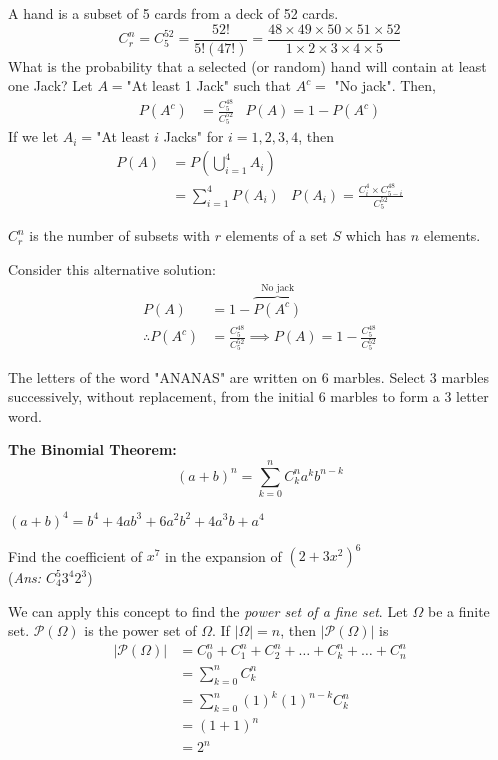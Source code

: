 \documentclass{article}
\begin{document}
	\begin{exmp}
		A hand is a subset of 5 cards from a deck of 52 cards.
		$$ C_r^n = C_5^{52} = \frac{52!}{5! (47!)} = \frac{48 \times 49 \times 50 \times 51 \times 52}{1 \times 2 \times 3 \times 4 \times 5}$$
		What is the probability that a selected (or random) hand will contain at least one Jack?
		Let $A = $"At least 1 Jack" such that  $A^c =$ "No jack". Then,
		\begin{align*}
			P(A^c) &= \frac{C^{48}_5}{C^{52}_5} &P(A) = 1-P(A^c)
		\end{align*}
		If we let $A_i = $"At least $i$ Jacks" for $i=1,2,3,4$, then
		\begin{align*}
			P(A) &= P\left( \bigcup_{i=1}^4 A_i \right)  \\
			&= \sum_{i=1}^4 P(A_i) &P(A_i) = \frac{C_i^4 \times C_{5-i}^{48}}{C_{5}^{52}}
		\end{align*}
		\begin{rem}
			$C_r^n$ is the number of subsets with $r$ elements of a set $S$ which has $n$ elements.
		\end{rem}
		Consider this alternative solution:
		\begin{align*}
			P(A) &= 1 - \overbrace{P(A^c)}^{\text{No jack}} \\
			\therefore P(A^c) &= \frac{C_{5}^{48}}{C_5^{52}} \implies P(A) = 1- \frac{C_{5}^{48}}{C_5^{52}} 
		\end{align*}
	\end{exmp}
	\begin{exe}
		The letters of the word "ANANAS" are written on 6 marbles. Select 3 marbles successively, without replacement, from the initial 6 marbles to form a 3 letter word.
	\end{exe}
\hfill
	\begin{thm}
		\textbf{The Binomial Theorem:}
		$$ (a+b)^n = \sum_{k=0}^n C_k^n a^{k}b^{n-k} $$
	\end{thm}
	\begin{exmp}
		$(a+b)^4 = b^4 + 4ab^3 + 6a^2b^2 + 4a^3 b + a^4$
	\end{exmp}
	\begin{exmp}
		Find the coefficient of $x^7$ in the expansion of $(2+3x^2)^6$ \\
		(\emph{Ans: $C_{4}^5 3^4 2^3$})
	\end{exmp}
\pagebreak

	We can apply this concept to find the \emph{power set of a fine set}. Let $\Omega$ be a finite set. $\mathcal{P}(\Omega)$ is the power set of $\Omega$. If $|\Omega| = n$, then $|\mathcal{P}(\Omega)|$ is
	\begin{align*}
		|\mathcal{P}(\Omega)| &= C_0^n + C_1^n + C_2^n + \dots + C_k^n + \dots + C_n^n \\
		&= \sum_{k=0}^n C_k^n \\
		&= \sum_{k=0}^n (1)^k (1)^{n-k} C_k^n \\
		&= (1+1)^n \\
		&\boxed{= 2^n}
 	\end{align*}
	
\end{document}
